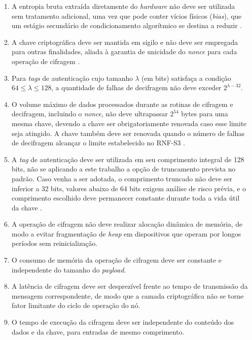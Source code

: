 \begin{enumerate}
    \item[RNF-S1.] A entropia bruta extraída diretamente do \textit{hardware} não deve ser utilizada sem tratamento adicional, uma vez que pode conter vícios físicos (\textit{bias}), que um estágio secundário de condicionamento algorítmico se destina a reduzir \cite{turan2018nist90b}.

    \item[RNF-S2.] A chave criptográfica deve ser mantida em sigilo e não deve ser empregada para outras finalidades, aliada à garantia de unicidade do \textit{nonce} para cada operação de cifragem \cite{nist800232}.

    \item[RNF-S3.] Para \textit{tags} de autenticação cujo tamanho $\lambda$ (em bits) satisfaça a condição $64 \leq \lambda \leq 128$, a quantidade de falhas de decifragem não deve exceder $2^{\lambda - 32}$.

    \item[RNF-S4.] O volume máximo de dados processados durante as rotinas de cifragem e decifragem, incluindo o \textit{nonce}, não deve ultrapassar $2^{54}$ bytes para uma mesma chave, devendo a chave ser obrigatoriamente renovada caso esse limite seja atingido. A chave também deve ser renovada quando o número de falhas de decifragem alcançar o limite estabelecido no RNF-S3 \cite{nist800232}.

    \item[RNF-S5.] A \textit{tag} de autenticação deve ser utilizada em seu comprimento integral de 128 bits, não se aplicando a este trabalho a opção de truncamento prevista no padrão. Caso venha a ser adotada, o comprimento truncado não deve ser inferior a 32 bits, valores abaixo de 64 bits exigem análise de risco prévia, e o comprimento escolhido deve permanecer constante durante toda a vida útil da chave \cite{nist800232}.

    \item[RNF-S6.] A operação de cifragem não deve realizar alocação dinâmica de memória, de modo a evitar fragmentação de \textit{heap} em dispositivos que operam por longos períodos sem reinicialização.

    \item[RNF-S7.] O consumo de memória da operação de cifragem deve ser constante e independente do tamanho do \textit{payload}.

    \item[RNF-S8.] A latência de cifragem deve ser desprezível frente ao tempo de transmissão da mensagem correspondente, de modo que a camada criptográfica não se torne fator limitante do ciclo de operação do nó.

    \item[RNF-S9.] O tempo de execução da cifragem deve ser independente do conteúdo dos dados e da chave, para entradas de mesmo comprimento.
\end{enumerate}

